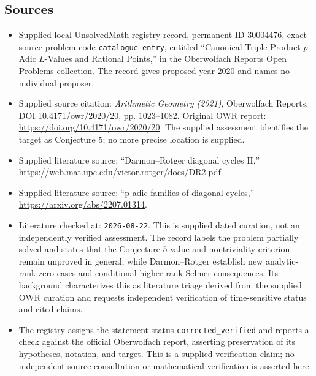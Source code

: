\documentclass[11pt]{article}
\begin{document}
\subsection{Sources}
\begin{itemize}
\item Supplied local UnsolvedMath registry record, permanent ID \(30004476\), exact source problem code \texttt{catalogue entry}, entitled ``Canonical Triple-Product \(p\)-Adic \(L\)-Values and Rational Points,'' in the Oberwolfach Reports Open Problems collection. The record gives proposed year 2020 and names no individual proposer.
\item Supplied source citation: \emph{Arithmetic Geometry (2021)}, Oberwolfach Reports, DOI 10.4171/owr/2020/20, pp. 1023--1082. Original OWR report: \url{https://doi.org/10.4171/owr/2020/20}. The supplied assessment identifies the target as Conjecture 5; no more precise location is supplied.
\item Supplied literature source: ``Darmon--Rotger diagonal cycles II,'' \url{https://web.mat.upc.edu/victor.rotger/docs/DR2.pdf}.
\item Supplied literature source: ``p-adic families of diagonal cycles,'' \url{https://arxiv.org/abs/2207.01314}.
\item Literature checked at: \texttt{2026-08-22}. This is supplied dated curation, not an independently verified assessment. The record labels the problem partially solved and states that the Conjecture 5 value and nontriviality criterion remain unproved in general, while Darmon--Rotger establish new analytic-rank-zero cases and conditional higher-rank Selmer consequences. Its background characterizes this as literature triage derived from the supplied OWR curation and requests independent verification of time-sensitive status and cited claims.
\item The registry assigns the statement status \texttt{corrected\_verified} and reports a check against the official Oberwolfach report, asserting preservation of its hypotheses, notation, and target. This is a supplied verification claim; no independent source consultation or mathematical verification is asserted here.
\end{itemize}
\end{document}
